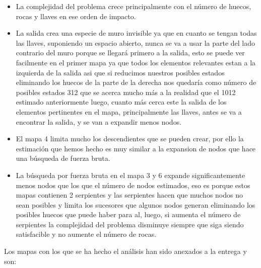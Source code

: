 \documentclass[11pt,spanish]{article}
\begin{document}
			\begin{itemize}
				\item La complejidad del problema crece principalmente con el número de huecos, rocas y llaves en ese orden de impacto.
				\item La salida crea una especie de muro invisible ya que en cuanto se tengan todas las llaves, suponiendo un espacio abierto, nunca se va a usar la parte del lado contrario del muro porque se llegará primero a la salida, esto se puede ver facilmente en el primer mapa ya que todos los elementos relevantes estan a la izquierda de la salida asi que si reducimos nuestros posibles estados eliminando los huecos de la parte de la derecha nos quedaría como número de posibles estados 312 que se acerca mucho más a la realidad que el 1012 estimado anteriormente luego, cuanto más cerca este la salida de los elementos pertinentes en el mapa, principalmente las llaves, antes se va a encontrar la salida, y se van a expandir menos nodos.
				\item El mapa 4 limita mucho los descendientes que se pueden crear, por ello la estimación que hemos hecho es muy similar a la expansion de nodos que hace una búsqueda de fuerza bruta.
				\item La búsqueda por fuerza bruta en el mapa 3 y 6 expande significantemente menos nodos que los que el número de nodos estimados, eso es porque estos mapas contienen 2 serpientes y las serpientes hacen que muchos nodos no sean posibles y limita los sucesores que algunos nodos generan eliminando los posibles huecos que puede haber para al, luego, si aumenta el número de serpientes la complejidad del problema disminuye siempre que siga siendo satisfacible y no aumente el número de rocas.
			\end{itemize}
			Los mapas con los que se ha hecho el análisis han sido anexados a la entrega y son:\\
\end{document}
